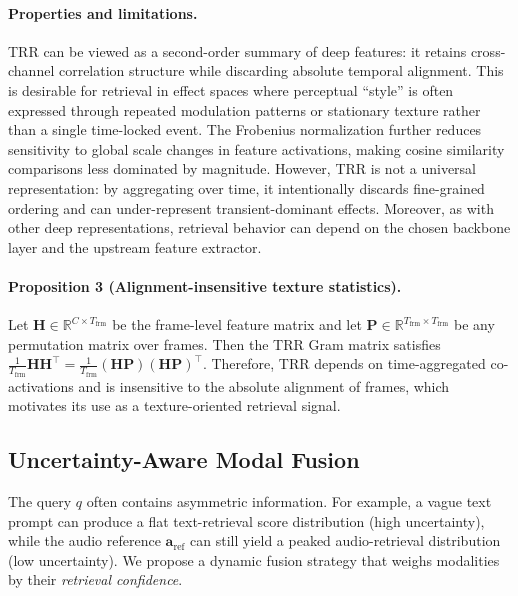 \documentclass{article}
\begin{document}
\paragraph{Properties and limitations.}
TRR can be viewed as a second-order summary of deep features: it retains cross-channel correlation structure while discarding absolute temporal alignment. This is desirable for retrieval in effect spaces where perceptual ``style'' is often expressed through repeated modulation patterns or stationary texture rather than a single time-locked event. The Frobenius normalization further reduces sensitivity to global scale changes in feature activations, making cosine similarity comparisons less dominated by magnitude.
However, TRR is not a universal representation: by aggregating over time, it intentionally discards fine-grained ordering and can under-represent transient-dominant effects. Moreover, as with other deep representations, retrieval behavior can depend on the chosen backbone layer and the upstream feature extractor.

\paragraph{Proposition 3 (Alignment-insensitive texture statistics).}
Let $\mathbf{H}\in\mathbb{R}^{C\times T_{\text{frm}}}$ be the frame-level feature matrix and let $\mathbf{P}\in\mathbb{R}^{T_{\text{frm}}\times T_{\text{frm}}}$ be any permutation matrix over frames. Then the TRR Gram matrix satisfies $\frac{1}{T_{\text{frm}}}\mathbf{H}\mathbf{H}^\top=\frac{1}{T_{\text{frm}}}(\mathbf{H}\mathbf{P})(\mathbf{H}\mathbf{P})^\top$. Therefore, TRR depends on time-aggregated co-activations and is insensitive to the absolute alignment of frames, which motivates its use as a texture-oriented retrieval signal.

\subsection{Uncertainty-Aware Modal Fusion}
\label{sssec:fusion_theory}

The query $q$ often contains asymmetric information. For example, a vague text prompt can produce a flat text-retrieval score distribution (high uncertainty), while the audio reference $\mathbf{a}_{\text{ref}}$ can still yield a peaked audio-retrieval distribution (low uncertainty). We propose a dynamic fusion strategy that weighs modalities by their \textit{retrieval confidence}.
\end{document}
